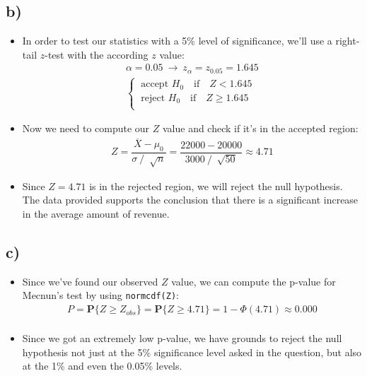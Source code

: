 \documentclass[12pt]{article}
\begin{document}
\subsection*{b)}
\begin{itemize}
    \item In order to test our statistics with a 5\% level of significance, we'll use a right-tail $z$-test with the according $z$ value:
    \begin{equation*}
        \begin{split}
            \alpha = 0.05 \ \rightarrow \ z_\alpha = z_{0.05} = 1.645 \\
            \begin{cases}
                \ \text{accept $H_0$} \quad \text{if} \quad Z < 1.645\\
                \ \text{reject $H_0$} \quad \text{if} \quad Z \geq 1.645\\
            \end{cases}
        \end{split}
    \end{equation*}
    \item Now we need to compute our $Z$ value and check if it's in the accepted region:
    \begin{equation*}
        \begin{split}
            Z = \dfrac{\overline{X} - \mu_0}{\sigma \ / \ \sqrt[]{n}} = \dfrac{22000 - 20000}{3000 \ / \ \sqrt[]{50}} \approx 4.71
        \end{split}
    \end{equation*}
    \item Since $Z = 4.71$ is in the rejected region, we will reject the null hypothesis. The data provided supports the conclusion that there is a significant increase in the average amount of revenue.
\end{itemize} 

\subsection*{c)} 
\begin{itemize}
    \item Since we've found our observed $Z$ value, we can compute the p-value for Mecnun's test by using \texttt{normcdf(Z)}:
    \begin{equation*}
        \begin{split}
            P = \textbf{P}\{Z \geq Z_{obs}\} = \textbf{P}\{Z \geq 4.71\} = 1 - \Phi(4.71) \approx 0.000\\
        \end{split}
    \end{equation*}
    \item Since we got an extremely low p-value, we have grounds to reject the null hypothesis not just at the 5\% significance level asked in the question, but also at the 1\% and even the 0.05\% levels.
\end{itemize}
\end{document}
